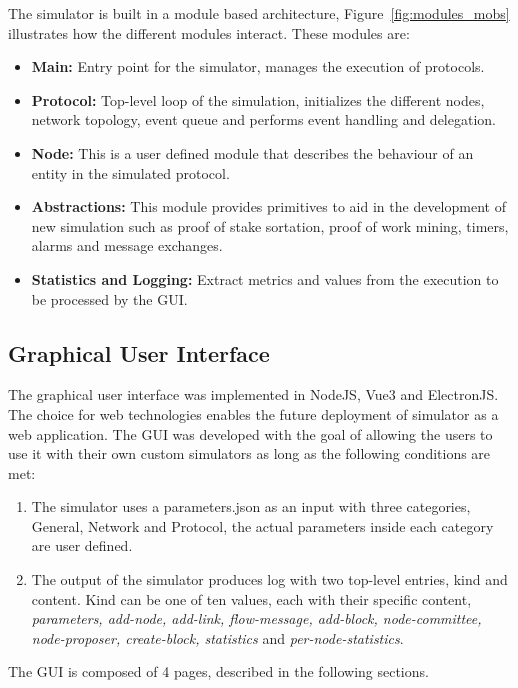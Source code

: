 The simulator is built in a module based architecture, Figure~\ref{fig:modules_mobs} illustrates
how the different modules interact. These modules are:
\begin{itemize}
  \item \textbf{Main:} Entry point for the simulator, manages the execution of
protocols.
  \item \textbf{Protocol:} Top-level loop of the simulation, initializes the different
nodes, network topology, event queue and performs event handling and delegation.
  \item \textbf{Node:} This is a user defined module that describes the behaviour
of an entity in the simulated protocol.
  \item \textbf{Abstractions:} This module provides primitives to aid in the
development of new simulation such as proof of stake sortation, proof of work mining,
timers, alarms and message exchanges.
  \item \textbf{Statistics and Logging:}  Extract metrics and values from the execution
to be processed by the GUI.
\end{itemize}

\subsection{Graphical User Interface}\label{subsec:grafical_user_interface}

The graphical user interface was implemented in NodeJS, Vue3 and ElectronJS.
The choice for web technologies enables the future deployment of simulator as
a web application. The GUI was developed with the goal of allowing the users
to use it with their own custom simulators as long as the following conditions are met:

\begin{enumerate}
  \item The simulator uses a parameters.json as an input with three categories,
General, Network and Protocol, the actual parameters inside each category are user defined.
  \item The output of the simulator produces log with two top-level entries, kind and content.
Kind can be one of ten values, each with their specific content, \textit{parameters, 
add-node, add-link, flow-message, add-block, node-committee, node-proposer, create-block,
statistics} and \textit{per-node-statistics}.
\end{enumerate}

The GUI is composed of 4 pages, described in the following sections.

